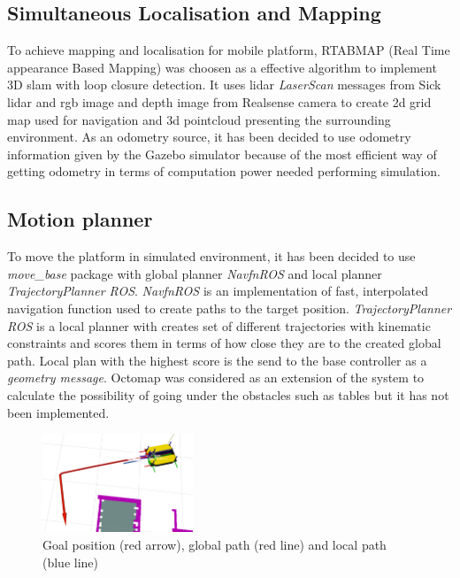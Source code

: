 \documentclass[conference,a4paper]{IEEEtran}
\begin{document}
\subsection{Simultaneous Localisation and Mapping}
To achieve mapping and localisation for mobile platform, RTABMAP (Real Time appearance Based Mapping) \cite{RTABMAP} was choosen as a effective algorithm to implement 3D slam with loop closure detection. It uses lidar \textit{LaserScan} messages from Sick lidar and rgb image and depth image from Realsense camera to create 2d grid map used for navigation and 3d pointcloud presenting the surrounding environment. 
As an odometry source, it has been decided to use odometry information given by the Gazebo simulator because of the most efficient way of getting odometry in terms of computation power needed performing simulation.

\subsection{Motion planner}
To move the platform in simulated environment, it has been decided to use \textit{move\_base} package with global planner \textit{NavfnROS} and local planner \textit{TrajectoryPlanner ROS}. \textit{NavfnROS} is an implementation of fast, interpolated navigation function used to create paths to the target position.  \textit{TrajectoryPlanner ROS} is a local planner with creates set of different trajectories with kinematic constraints
and scores them in terms of how close they are to the created global path. Local plan with the highest score is the send to the base controller as a \textit{geometry message}.
Octomap was considered as an extension of the system to calculate the possibility of going under the obstacles such as tables but it has not been implemented. 

\begin{figure}[ht]
  \centering
  \includegraphics[width=0.4\textwidth]{img/global_local_planner.png}
  \caption[global and local path]{Goal position (red arrow), global path (red line) and local path (blue line)}
\end{figure}
\end{document}
